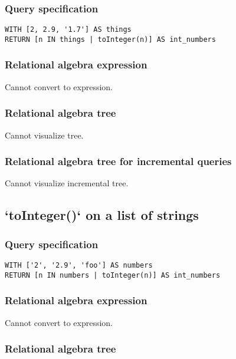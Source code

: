 \subsubsection*{Query specification}

\begin{lstlisting}
WITH [2, 2.9, '1.7'] AS things
RETURN [n IN things | toInteger(n)] AS int_numbers
\end{lstlisting}

\subsubsection*{Relational algebra expression}

Cannot convert to expression.

\subsubsection*{Relational algebra tree}

Cannot visualize tree.

\subsubsection*{Relational algebra tree for incremental queries}

Cannot visualize incremental tree.

\subsection{`toInteger()` on a list of strings}

\subsubsection*{Query specification}

\begin{lstlisting}
WITH ['2', '2.9', 'foo'] AS numbers
RETURN [n IN numbers | toInteger(n)] AS int_numbers
\end{lstlisting}

\subsubsection*{Relational algebra expression}

Cannot convert to expression.

\subsubsection*{Relational algebra tree}

